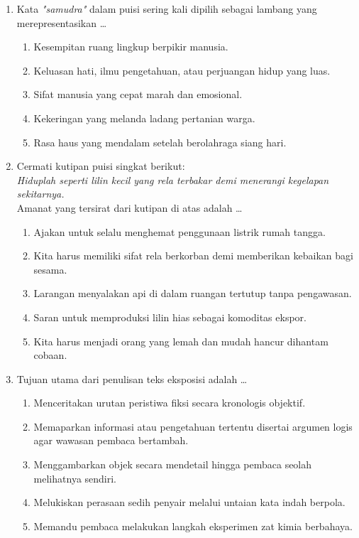 \documentclass[12pt,a4paper]{article}
\begin{document}
\begin{enumerate}[leftmargin=*]
\item Kata \textit{"samudra"} dalam puisi sering kali dipilih sebagai lambang yang merepresentasikan \dots
    \begin{enumerate}[label=\alph*.]
        \item Kesempitan ruang lingkup berpikir manusia.
        \item Keluasan hati, ilmu pengetahuan, atau perjuangan hidup yang luas.
        \item Sifat manusia yang cepat marah dan emosional.
        \item Kekeringan yang melanda ladang pertanian warga.
        \item Rasa haus yang mendalam setelah berolahraga siang hari.
    \end{enumerate}

\item Cermati kutipan puisi singkat berikut:\\
\textit{Hiduplah seperti lilin kecil yang rela terbakar demi menerangi kegelapan sekitarnya.}\\
Amanat yang tersirat dari kutipan di atas adalah \dots
    \begin{enumerate}[label=\alph*.]
        \item Ajakan untuk selalu menghemat penggunaan listrik rumah tangga.
        \item Kita harus memiliki sifat rela berkorban demi memberikan kebaikan bagi sesama.
        \item Larangan menyalakan api di dalam ruangan tertutup tanpa pengawasan.
        \item Saran untuk memproduksi lilin hias sebagai komoditas ekspor.
        \item Kita harus menjadi orang yang lemah dan mudah hancur dihantam cobaan.
    \end{enumerate}



\item Tujuan utama dari penulisan teks eksposisi adalah \dots
    \begin{enumerate}[label=\alph*.]
        \item Menceritakan urutan peristiwa fiksi secara kronologis objektif.
        \item Memaparkan informasi atau pengetahuan tertentu disertai argumen logis agar wawasan pembaca bertambah.
        \item Menggambarkan objek secara mendetail hingga pembaca seolah melihatnya sendiri.
        \item Melukiskan perasaan sedih penyair melalui untaian kata indah berpola.
        \item Memandu pembaca melakukan langkah eksperimen zat kimia berbahaya.
    \end{enumerate}


\end{enumerate}
\end{document}
